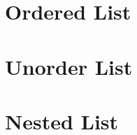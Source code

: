 \documentclass{article}
\begin{document}
	
	\section*{Ordered List}
	
	
	
	\section*{Unorder List}
	
	
	
	\section*{Nested List}


	

	
\end{document}
